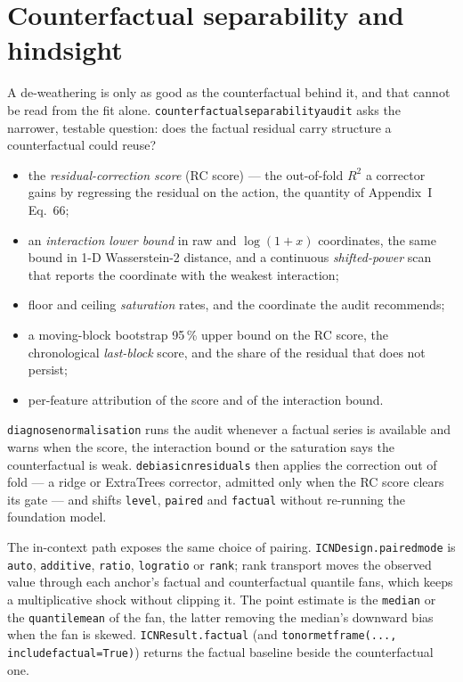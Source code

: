 \documentclass[11pt]{report}
\newcommand{\nosep}{\setlength{\itemsep}{0pt}\setlength{\parskip}{0pt}\setlength{\topsep}{2pt}}
\newcommand{\codeunderscore}{\textunderscore\allowbreak}
\newcommand{\code}[1]{\texttt{\let\_\codeunderscore #1}}
\begin{document}
\section{Counterfactual separability and hindsight}\label{sec:separability}
A de-weathering is only as good as the counterfactual behind it, and that cannot be read
from the fit alone. \code{counterfactual\_separability\_audit} asks the narrower, testable
question: does the factual residual carry structure a counterfactual could reuse?
\begin{itemize}\nosep
  \item the \emph{residual-correction score} (RC score) --- the out-of-fold $R^2$ a
        corrector gains by regressing the residual on the action, the quantity of
        Appendix~I Eq.~66;
  \item an \emph{interaction lower bound} in raw and $\log(1+x)$ coordinates, the
        same bound in 1-D Wasserstein-2 distance, and a continuous \emph{shifted-power}
        scan that reports the coordinate with the weakest interaction;
  \item floor and ceiling \emph{saturation} rates, and the coordinate the audit
        recommends;
  \item a moving-block bootstrap 95\,\% upper bound on the RC score, the chronological
        \emph{last-block} score, and the share of the residual that does not persist;
  \item per-feature attribution of the score and of the interaction bound.
\end{itemize}
\code{diagnose\_normalisation} runs the audit whenever a factual series is available and
warns when the score, the interaction bound or the saturation says the counterfactual is
weak. \code{debias\_icn\_residuals} then applies the correction out of fold --- a ridge or
ExtraTrees corrector, admitted only when the RC score clears its gate --- and shifts
\code{level}, \code{paired} and \code{factual} without re-running the foundation model.

The in-context path exposes the same choice of pairing. \code{ICNDesign.paired\_mode}
is \code{auto}, \code{additive}, \code{ratio}, \code{log\_ratio} or \code{rank}; rank
transport moves the observed value through each anchor's factual and counterfactual
quantile fans, which keeps a multiplicative shock without clipping it. The point estimate
is the \code{median} or the \code{quantile\_mean} of the fan, the latter removing the
median's downward bias when the fan is skewed. \code{ICNResult.factual} (and
\code{to\_normet\_frame(..., include\_factual=True)}) returns the factual baseline
beside the counterfactual one.
\end{document}
